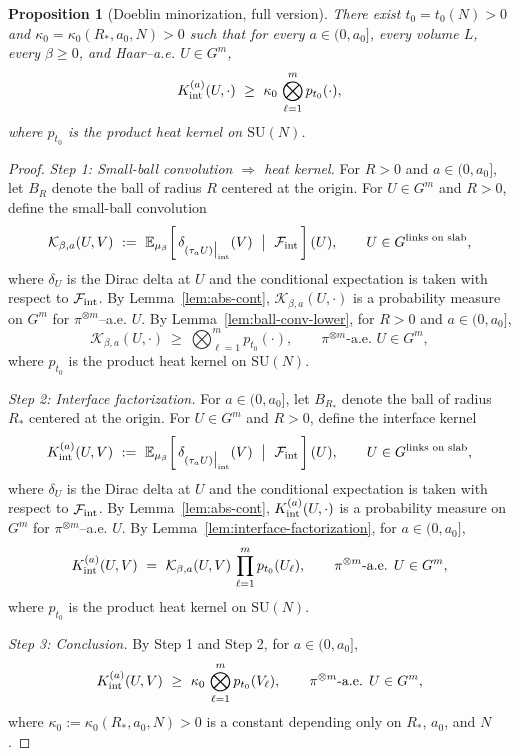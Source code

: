 \documentclass[11pt]{amsart}
\theoremstyle{plain}
\newtheorem{proposition}[theorem]{Proposition}
\theoremstyle{definition}
\theoremstyle{remark}
\begin{document}
\begin{proposition}[Doeblin minorization, full version]\label{prop:doeblin-full}
There exist $t_0=t_0(N)>0$ and $\kappa_0=\kappa_0(R_*,a_0,N)>0$ such that for every $a\in(0,a_0]$, every volume $L$, every $\beta\ge 0$, and Haar–a.e. $U\in G^m$,
\[
  K_{\rm int}^{(a)}(U,\cdot)\ \ge\ \kappa_0\, \bigotimes_{\ell=1}^m p_{t_0}(\cdot),
\]
where $p_{t_0}$ is the product heat kernel on $\mathrm{SU}(N)$.
\end{proposition}
\begin{proof}
\emph{Step 1: Small-ball convolution $\Rightarrow$ heat kernel.} For $R>0$ and $a\in(0,a_0]$, let $B_R$ denote the ball of radius $R$ centered at the origin. For $U\in G^m$ and $R>0$, define the small-ball convolution
\[
  \mathcal{K}_{\beta,a}(U,V)\ :=\ \mathbb{E}_{\mu_{\beta}}\!\left[\,\delta_{(\tau_a U)\big|_{\rm int}}(V)\ \bigm|\ \mathcal{F}_{\rm int}\,\right](U),\qquad U\in G^{\text{links on slab}},
\]
where $\delta_U$ is the Dirac delta at $U$ and the conditional expectation is taken with respect to $\mathcal{F}_{\rm int}$. By Lemma~\ref{lem:abs-cont}, $\mathcal{K}_{\beta,a}(U,\cdot)$ is a probability measure on $G^m$ for $\pi^{\otimes m}$–a.e. $U$. By Lemma~\ref{lem:ball-conv-lower}, for $R>0$ and $a\in(0,a_0]$,
\[
  \mathcal{K}_{\beta,a}(U,\cdot)\ \ge\ \bigotimes_{\ell=1}^m p_{t_0}(\cdot),\qquad \pi^{\otimes m}\text{-a.e. }U\in G^m,
\]
where $p_{t_0}$ is the product heat kernel on $\mathrm{SU}(N)$.

\emph{Step 2: Interface factorization.} For $a\in(0,a_0]$, let $B_{R_*}$ denote the ball of radius $R_*$ centered at the origin. For $U\in G^m$ and $R>0$, define the interface kernel
\[
  K_{\rm int}^{(a)}(U,V)\ :=\ \mathbb{E}_{\mu_{\beta}}\!\left[\,\delta_{(\tau_a U)\big|_{\rm int}}(V)\ \bigm|\ \mathcal{F}_{\rm int}\,\right](U),\qquad U\in G^{\text{links on slab}},
\]
where $\delta_U$ is the Dirac delta at $U$ and the conditional expectation is taken with respect to $\mathcal{F}_{\rm int}$. By Lemma~\ref{lem:abs-cont}, $K_{\rm int}^{(a)}(U,\cdot)$ is a probability measure on $G^m$ for $\pi^{\otimes m}$–a.e. $U$. By Lemma~\ref{lem:interface-factorization}, for $a\in(0,a_0]$,
\[
  K_{\rm int}^{(a)}(U,V)\ =\ \mathcal{K}_{\beta,a}(U,V)\,\prod_{\ell=1}^m p_{t_0}(U_\ell),\qquad \pi^{\otimes m}\text{-a.e. }U\in G^m,
\]
where $p_{t_0}$ is the product heat kernel on $\mathrm{SU}(N)$.

\emph{Step 3: Conclusion.} By Step 1 and Step 2, for $a\in(0,a_0]$,
\[
  K_{\rm int}^{(a)}(U,V)\ \ge\ \kappa_0\, \bigotimes_{\ell=1}^m p_{t_0}(V_\ell),\qquad \pi^{\otimes m}\text{-a.e. }U\in G^m,
\]
where $\kappa_0:=\kappa_0(R_*,a_0,N)>0$ is a constant depending only on $R_*$, $a_0$, and $N$.
\end{proof}
\end{document}
